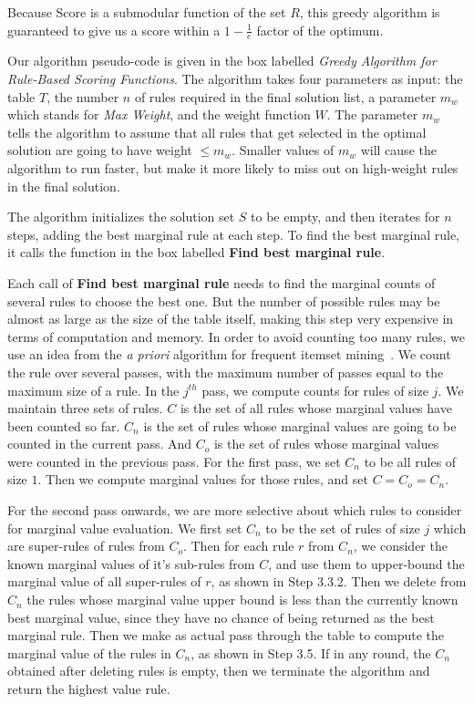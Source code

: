 \documentclass{sig-alternate}
\begin{document}
Because Score is a submodular function of the set $R$, this greedy algorithm is guaranteed to give us a score within a $1 - \frac{1}{e}$ factor of the optimum. 

Our algorithm pseudo-code is given in the box labelled {\em Greedy Algorithm for Rule-Based Scoring Functions}. The algorithm takes four parameters as input: the table $T$, the number $n$ of rules required in the final solution list, a parameter $m_w$ which stands for \textit{Max Weight}, and the weight function $W$. The parameter $m_w$ tells the algorithm to assume that all rules that get selected in the optimal solution are going to have weight $\leq m_w$. Smaller values of $m_w$ will cause the algorithm to run faster, but make it more likely to miss out on high-weight rules in the final solution. 

The algorithm initializes the solution set $S$ to be empty, and then iterates for $n$ steps, adding the best marginal rule at each step. To find the best marginal rule, it calls the function in the box labelled \textbf{Find best marginal rule}. 

Each call of \textbf{Find best marginal rule} needs to find the marginal counts of several rules to choose the best one. But the number of possible rules may be almost as large as the size of the table itself, making this step very expensive in terms of computation and memory. In order to avoid counting too many rules, we use an idea from the {\em a priori} algorithm for frequent itemset mining~\cite{apriori}. We count the rule over several passes, with the maximum number of passes equal to the maximum size of a rule. In the $j^{th}$ pass, we compute counts for rules of size $j$. We maintain three sets of rules. $C$ is the set of all rules whose marginal values have been counted so far. $C_n$ is the set of rules whose marginal values are going to be counted in the current pass. And $C_o$ is the set of rules whose marginal values were counted in the previous pass. For the first pass, we set $C_n$ to be all rules of size $1$. Then we compute marginal values for those rules, and set $C = C_o = C_n$.

For the second pass onwards, we are more selective about which rules to consider for marginal value evaluation. We first set $C_n$ to be the set of rules of size $j$ which are super-rules of rules from $C_o$. Then for each rule $r$ from $C_n$, we consider the known marginal values of it's sub-rules from $C$, and use them to upper-bound the marginal value of all super-rules of $r$, as shown in Step 3.3.2. Then we delete from $C_n$ the rules whose marginal value upper bound is less than the currently known best marginal value, since they have no chance of being returned as the best marginal rule. Then we make as actual pass through the table to compute the marginal value of the rules in $C_n$, as shown in Step 3.5. If in any round, the $C_n$ obtained after deleting rules is empty, then we terminate the algorithm and return the highest value rule. 
\end{document}
